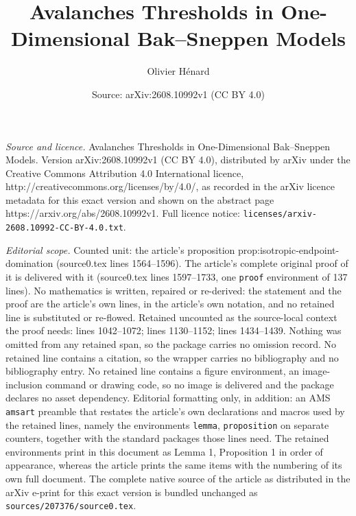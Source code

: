 \documentclass[10pt,a4paper]{amsart}
\title{Avalanches Thresholds in One-Dimensional Bak--Sneppen Models}
\author{Olivier H\'enard}
\date{Source: arXiv:2608.10992v1 (CC BY 4.0)}
\begin{document}
\maketitle

\noindent\emph{Source and licence.} Avalanches Thresholds in One-Dimensional Bak--Sneppen Models. Version arXiv:2608.10992v1 (CC BY 4.0), distributed by arXiv under the Creative Commons Attribution 4.0 International licence, http://creativecommons.org/licenses/by/4.0/, as recorded in the arXiv licence metadata for this exact version and shown on the abstract page https://arxiv.org/abs/2608.10992v1. Full licence notice: \texttt{licenses/arxiv-2608.10992-CC-BY-4.0.txt}.\par\smallskip

\noindent\textit{Editorial scope.} Counted unit: the article's proposition prop:isotropic-endpoint-domination (source0.tex lines 1564--1596). The article's complete original proof of it is delivered with it (source0.tex lines 1597--1733, one \texttt{proof} environment of 137 lines). No mathematics is written, repaired or re-derived: the statement and the proof are the article's own lines, in the article's own notation, and no retained line is substituted or re-flowed.  Retained uncounted as the source-local context the proof needs: lines 1042--1072; lines 1130--1152; lines 1434--1439.  Nothing was omitted from any retained span, so the package carries no omission record.  No retained line contains a citation, so the wrapper carries no bibliography and no bibliography entry.  No retained line contains a figure environment, an image-inclusion command or drawing code, so no image is delivered and the package declares no asset dependency.  Editorial formatting only, in addition: an AMS \texttt{amsart} preamble that restates the article's own declarations and macros used by the retained lines, namely the environments \texttt{lemma}, \texttt{proposition} on separate counters, together with the standard packages those lines need.  The retained environments print in this document as Lemma 1, Proposition 1 in order of appearance, whereas the article prints the same items with the numbering of its own full document.  The complete native source of the article as distributed in the arXiv e-print for this exact version is bundled unchanged as \texttt{sources/207376/source0.tex}.
\end{document}
